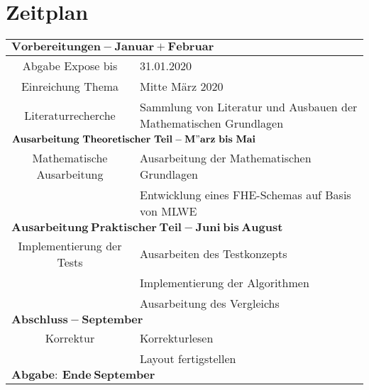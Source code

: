 \chapter{Zeitplan}
\label{Zeitplan}

\begin{tabular}{|c | p{10cm} |}
  \toprule
  \multicolumn{2}{|l|}{$\mathbf{Vorbereitungen - Januar+Februar}$}                               \\
  \midrule
  Abgabe Expose bis          & 31.01.2020                                                        \\
  Einreichung Thema          & Mitte März 2020                                                   \\
  Literaturrecherche         & Sammlung von Literatur und Ausbauen der Mathematischen Grundlagen \\
  \midrule
  \multicolumn{2}{|l|}{$\mathbf{Ausarbeitung~Theoretischer~Teil - M"arz~bis~Mai}$}                \\
  \midrule
  Mathematische Ausarbeitung & Ausarbeitung der Mathematischen Grundlagen                        \\
                             & Entwicklung eines FHE-Schemas auf Basis von MLWE                  \\
  \midrule
  \multicolumn{2}{|l|}{$\mathbf{Ausarbeitung~Praktischer~Teil - Juni~bis~August}$}               \\
  \midrule
  Implementierung der Tests  & Ausarbeiten des Testkonzepts                                      \\
                             & Implementierung der Algorithmen                                   \\
                             & Ausarbeitung des Vergleichs                                       \\
  \midrule
  \multicolumn{2}{|l|}{$\mathbf{Abschluss - September}$}                                         \\
  \midrule
  Korrektur                  & Korrekturlesen                                                    \\
                             & Layout fertigstellen                                              \\
  \midrule
  \multicolumn{2}{|l|}{$\mathbf{Abgabe:~Ende~September}$}                                         \\
  \bottomrule                                                    
\end{tabular}